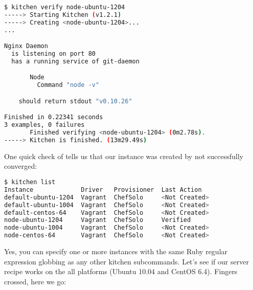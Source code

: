 \begin{lstlisting}[language=Bash,label=lst:testing-test-kitchen40]
$ kitchen verify node-ubuntu-1204
-----> Starting Kitchen (v1.2.1)
-----> Creating <node-ubuntu-1204>...
...

Nginx Daemon
  is listening on port 80
  has a running service of git-daemon

       Node
         Command "node -v"

    should return stdout "v0.10.26"

Finished in 0.22341 seconds
3 examples, 0 failures
       Finished verifying <node-ubuntu-1204> (0m2.78s).
-----> Kitchen is finished. (13m29.49s)

\end{lstlisting}

One quick check of  tells us that our instance was created by not successfully converged:

\begin{lstlisting}[language=Bash,label=lst:testing-test-kitchen41]
$ kitchen list
Instance             Driver   Provisioner  Last Action
default-ubuntu-1204  Vagrant  ChefSolo     <Not Created>
default-ubuntu-1004  Vagrant  ChefSolo     <Not Created>
default-centos-64    Vagrant  ChefSolo     <Not Created>
node-ubuntu-1204     Vagrant  ChefSolo     Verified
node-ubuntu-1004     Vagrant  ChefSolo     <Not Created>
node-centos-64       Vagrant  ChefSolo     <Not Created>
\end{lstlisting}

Yes, you can specify one or more instances with the same Ruby regular expression globbing as any other kitchen subcommands. Let's see if our server recipe works on the all platforms (Ubuntu 10.04 and CentOS 6.4). Fingers crossed, here we go:

